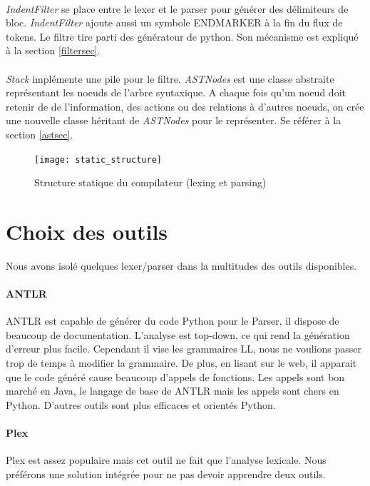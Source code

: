 \documentclass[a4paper,11pt]{article}
\begin{document}
        \paragraph{}
     \emph{IndentFilter} se place entre le lexer et le parser pour générer des délimiteurs de bloc. \emph{IndentFilter} ajoute aussi un symbole ENDMARKER à la fin du flux de tokens.
     Le filtre tire parti des générateur de python.
    Son mécanisme est expliqué à la section \ref{filtersec}.
    
    \paragraph{}
    \emph{Stack} implémente une pile pour le filtre. \emph{ASTNodes} est une classe abstraite représentant les noeuds de l'arbre syntaxique.
    A chaque fois qu'un noeud doit retenir de de l'information, des actions ou des relations à d'autres noeuds, on crée une nouvelle classe héritant de \emph{ASTNodes} pour le représenter.
    Se référer à la section \ref{astsec}.
   
    \begin{figure}[h]
    \texttt{[image: static\_structure]}
    \caption{Structure statique du compilateur (lexing et parsing)}
    \label{static_structure}
    \end{figure}
    
\section{Choix des outils}
    Nous avons isolé quelques lexer/parser dans la multitudes des outils disponibles.
    
    \paragraph{ANTLR}
        ANTLR est capable de générer du code Python pour le Parser, il dispose de beaucoup de documentation.
        L'analyse est top-down, ce qui rend la génération d'erreur plus facile.
        Cependant il vise les grammaires LL, nous ne voulions passer trop de temps à modifier la grammaire.
        De plus, en lisant sur le web, il apparait que le code généré cause beaucoup d'appels de fonctions\cite{antlr_ply_pyparsing}.
        Les appels sont bon marché en Java, le langage de base de ANTLR mais les appels sont chers en Python. 
        D'autres outils sont plus efficaces et orientés Python.
        
    \paragraph{Plex}
        Plex est assez populaire mais cet outil ne fait que l'analyse lexicale.
        Nous préférons une solution intégrée pour ne pas devoir apprendre deux outils.
        
\end{document}
